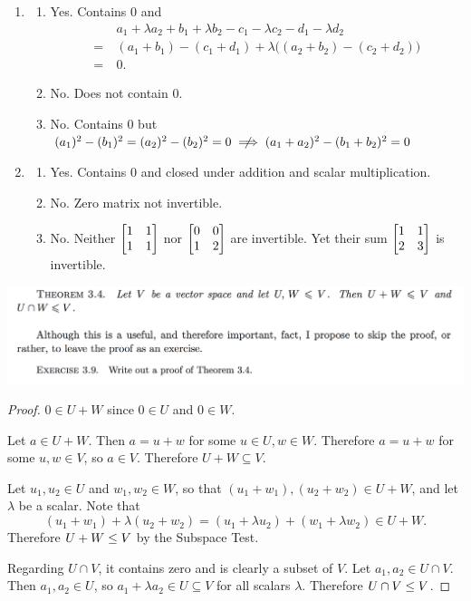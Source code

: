 \documentclass[12pt]{article}
\begin{document}
\begin{enumerate}[label=(\alph*)]
\item
  \begin{enumerate}[label=(\roman*)]
  \item Yes. Contains $0$ and
    \begin{align*}
      &a_1 + \lambda a_2 + b_1 + \lambda b_2 - c_1 - \lambda c_2 - d_1 - \lambda d_2\\
      =~&(a_1 + b_1) - (c_1 + d_1) + \lambda\Big((a_2 + b_2) - (c_2 + d_2)\Big)\\
      =~&0.
    \end{align*}
  \item No. Does not contain 0.
  \item No. Contains 0 but $(a_1)^2 - (b_1)^2 = (a_2)^2 - (b_2)^2 = 0 \nimplies (a_1 + a_2)^2 - (b_1 + b_2)^2 = 0$
  \end{enumerate}
\item
  \begin{enumerate}[label=(\roman*)]
  \item Yes. Contains 0 and closed under addition and scalar multiplication.
  \item No. Zero matrix not invertible.
  \item No. Neither $\begin{bmatrix}1 & 1\\1 & 1\\ \end{bmatrix}$ nor $\begin{bmatrix}0 & 0\\1 & 2\\ \end{bmatrix}$ are invertible.
        Yet their sum $\begin{bmatrix}1 & 1\\2 & 3\\ \end{bmatrix}$ is invertible.
  \end{enumerate}
\end{enumerate}

\begin{mdframed}
\includegraphics[width=400pt]{img/oxford-prelims-M1-linear-algebra-3-9.png}
\end{mdframed}

\begin{proof}
  $0 \in U + W$ since $0 \in U$ and $0 \in W$.

  Let $a \in U + W$. Then $a = u + w$ for some $u \in U, w \in W$. Therefore
  $a = u + w$ for some $u, w \in V$, so $a \in V$. Therefore
  $U + W \subseteq V$.

  Let $u_1, u_2 \in U$ and $w_1, w_2 \in W$, so that
  $(u_1 + w_1), (u_2 + w_2) \in U + W$, and let $\lambda$ be a scalar. Note
  that
  $$
  (u_1 + w_1) + \lambda(u_2 + w_2) = (u_1 + \lambda u_2) + (w_1 + \lambda w_2) \in U + W.
  $$
  Therefore $U + W \leq V$ by the Subspace Test.

  Regarding $U \cap V$, it contains zero and is clearly a subset of $V$. Let
  $a_1, a_2 \in U \cap V$. Then $a_1, a_2 \in U$, so
  $a_1 + \lambda a_2 \in U \subseteq V$ for all scalars $\lambda$. Therefore
  $U \cap V \leq V$.
\end{proof}
\end{document}
